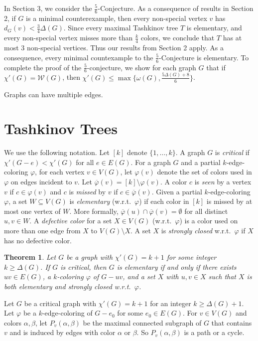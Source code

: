 \documentclass[12pt]{amsart}
\theoremstyle{plain}
\newtheorem{thm}{Theorem}
\theoremstyle{definition}
\theoremstyle{remark}
\newcommand{\fancy}[1]{\mathcal{#1}}
\newcommand{\W}{\fancy{W}}
\newcommand{\vph}{\varphi}
\newcommand{\vphn}{\overline{\varphi}}
\begin{document}
In Section 3, we consider the %
$\frac56$-Conjecture.  As a consequence of results in Section 2,
if $G$ is a minimal counterexample, then every non-special vertex $v$ has
$d_G(v)<\frac34\Delta(G)$.  Since every maximal Tashkinov tree $T$ is
elementary, and every non-special vertex misses more than $\frac{k}4$ colors, we
conclude that $T$ has at most 3 non-special vertices.  Thus our results from
Section 2 apply.  As a consequence, every minimal countexample to the
$\frac56$-Conjecture is elementary.  To complete the proof of the $\frac56$-conjecture,
we show for each graph $G$ that if $\chi'(G)=\W(G)$, then
$\chi'(G)\le\max\{\omega(G),\frac{5\Delta(G)+8}6\}$.


Graphs can have multiple edges.

\section{Tashkinov Trees}
We use the following notation.  
Let $[k]$ denote $\{1,\ldots,k\}$.
A graph $G$ is \emph{critical} if $\chi'(G-e) < \chi'(G)$ for all $e \in E(G)$. 
For a graph $G$ and a partial $k$-edge-coloring $\varphi$, for each vertex $v\in
V(G)$, let $\varphi(v)$ denote the set of colors used in $\varphi$ on edges
incident to $v$.  Let $\vphn(v)=[k]\setminus\varphi(v)$.  A color $c$ is
\emph{seen} by a vertex $v$ if $c\in \varphi(v)$ and $c$ is \emph{missed} by $v$
if $c\in\vphn(v)$.
Given a partial $k$-edge-coloring $\varphi$, a set $W\subseteq V(G)$ is
\emph{elementary} (w.r.t.~$\varphi$) if each color in $[k]$ is
missed by at most one vertex of $W$.  More formally, $\vphn(u)\cap
\vphn(v)=\emptyset$ for all distinct $u,v\in W$.
A \emph{defective color} for a set $X\in V(G)$ (w.r.t.~$\varphi$) is a color
used on more than one edge from $X$ to $V(G) \setminus X$.  
A set $X$ is \emph{strongly closed} w.r.t.~$\varphi$ if $X$ has no 
defective color.
% 

\begin{thm}
Let $G$ be a graph with $\chi'(G)=k+1$ for some integer $k\ge \Delta(G)$.  If
$G$ is critical, then $G$ is elementary if and only if there exists $uv\in E(G)$,
a $k$-coloring $\vph$ of $G-uv$, and a set $X$ with $u,v\in X$ such
that $X$ is both elementary and strongly closed w.r.t.~$\varphi$.
\end{thm}

Let $G$ be a critical graph with $\chi'(G) = k+1$ for an integer $k \ge \Delta(G) + 1$. 
Let $\varphi$ be a $k$-edge-coloring of $G - e_0$ for some $e_0 \in E(G)$.  
For $v \in V(G)$ and colors $\alpha, \beta$, let $P_v(\alpha, \beta)$ be the
maximal connected subgraph of $G$ that contains $v$ and is induced by edges with color
$\alpha$ or $\beta$.  So $P_v(\alpha, \beta)$ is a path or a cycle.
\end{document}
